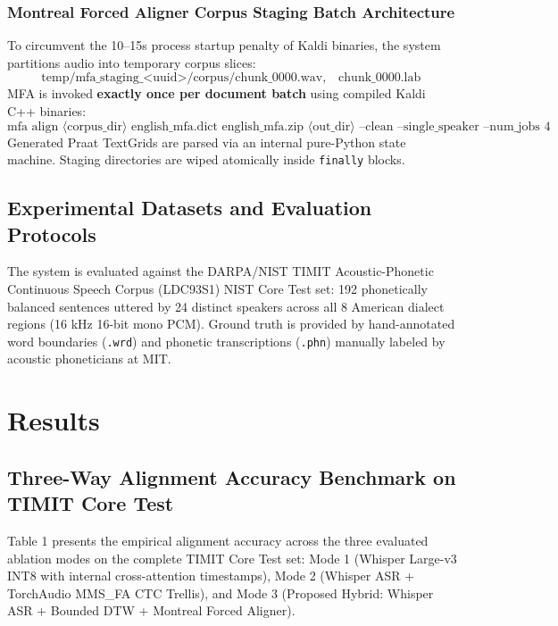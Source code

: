 \documentclass[12pt,a4paper]{article}
\begin{document}
\subsubsection{Montreal Forced Aligner Corpus Staging Batch Architecture}
To circumvent the 10--15s process startup penalty of Kaldi binaries, the system partitions audio into temporary corpus slices:
$$\text{temp/mfa\_staging\_<uuid>/corpus/chunk\_0000.wav}, \quad \text{chunk\_0000.lab}$$
MFA is invoked \textbf{exactly once per document batch} using compiled Kaldi C++ binaries:
$$\text{mfa align } \langle \text{corpus\_dir} \rangle \text{ english\_mfa.dict english\_mfa.zip } \langle \text{out\_dir} \rangle \text{ --clean --single\_speaker --num\_jobs 4}$$
Generated Praat TextGrids are parsed via an internal pure-Python state machine. Staging directories are wiped atomically inside \texttt{finally} blocks.

\subsection{Experimental Datasets and Evaluation Protocols}
The system is evaluated against the DARPA/NIST TIMIT Acoustic-Phonetic Continuous Speech Corpus (LDC93S1) NIST Core Test set: 192 phonetically balanced sentences uttered by 24 distinct speakers across all 8 American dialect regions (16 kHz 16-bit mono PCM). Ground truth is provided by hand-annotated word boundaries (\texttt{.wrd}) and phonetic transcriptions (\texttt{.phn}) manually labeled by acoustic phoneticians at MIT.

\section{Results}

\subsection{Three-Way Alignment Accuracy Benchmark on TIMIT Core Test}
Table 1 presents the empirical alignment accuracy across the three evaluated ablation modes on the complete TIMIT Core Test set: Mode 1 (Whisper Large-v3 INT8 with internal cross-attention timestamps), Mode 2 (Whisper ASR + TorchAudio MMS\_FA CTC Trellis), and Mode 3 (Proposed Hybrid: Whisper ASR + Bounded DTW + Montreal Forced Aligner).
\end{document}
